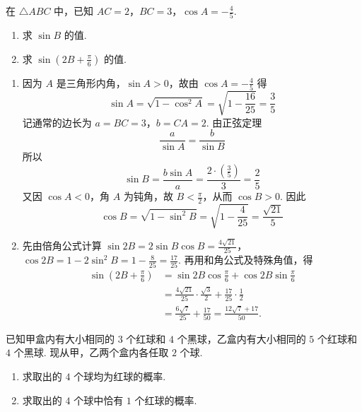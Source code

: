 \begin{problem}
在 \(\triangle ABC\) 中，已知 \(AC = 2\)，\(BC = 3\)，\(\cos A = -\frac{4}{5}\).

\begin{enumerate}
\item 求 \(\sin B\) 的值.
\item 求 \(\sin\left(2B+\frac{\pi}{6}\right)\) 的值.
\end{enumerate}
\end{problem}

\begin{solution}
\begin{enumerate}
\item 因为 \(A\) 是三角形内角，\(\sin A>0\)，故由 \(\cos A=-\frac45\) 得
\[
\sin A=\sqrt{1-\cos^2A}=\sqrt{1-\frac{16}{25}}=\frac35
\]
记通常的边长为 \(a=BC=3\)，\(b=CA=2\). 由正弦定理
\[
\frac{a}{\sin A}=\frac{b}{\sin B}
\]
所以
\[
\sin B=\frac{b\sin A}{a}=\frac{2\cdot(\frac{3}{5})}3=\frac25
\]
又因 \(\cos A<0\)，角 \(A\) 为钝角，故 \(B<\frac\pi2\)，从而 \(\cos B>0\). 因此
\[
\cos B=\sqrt{1-\sin^2B}=\sqrt{1-\frac4{25}}=\frac{\sqrt{21}}5
\]
\item 先由倍角公式计算
\(\sin2B=2\sin B\cos B=\frac{4\sqrt{21}}{25}\)，\(\cos2B=1-2\sin^2B=1-\frac8{25}=\frac{17}{25}\).
再用和角公式及特殊角值，得
\[
\begin{aligned}
\sin\left(2B+\frac\pi6\right)
&=\sin2B\cos\frac\pi6+\cos2B\sin\frac\pi6\\
&=\frac{4\sqrt{21}}{25}\cdot\frac{\sqrt3}{2}+\frac{17}{25}\cdot\frac12\\
&=\frac{6\sqrt7}{25}+\frac{17}{50}
=\frac{12\sqrt7+17}{50}.
\end{aligned}
\]
\end{enumerate}
\end{solution}

\begin{problem}
已知甲盒内有大小相同的 \(3\) 个红球和 \(4\) 个黑球，乙盒内有大小相同的 \(5\) 个红球和 \(4\) 个黑球. 现从甲，乙两个盒内各任取 \(2\) 个球.

\begin{enumerate}
\item 求取出的 \(4\) 个球均为红球的概率.
\item 求取出的 \(4\) 个球中恰有 \(1\) 个红球的概率.
\end{enumerate}
\end{problem}

